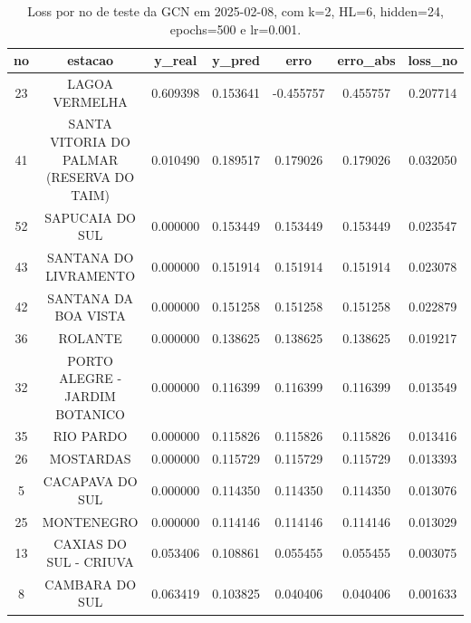 \begin{table}[h]
\centering
\caption{Loss por no de teste da GCN em 2025-02-08, com k=2, HL=6, hidden=24, epochs=500 e lr=0.001.}
\label{tab:gcn_loss_k2_hl6_h24_e500_d20250208}
\begin{tabular}{ccccccc}
\toprule
no & estacao & y\_real & y\_pred & erro & erro\_abs & loss\_no \\
\midrule
23 & LAGOA VERMELHA & 0.609398 & 0.153641 & -0.455757 & 0.455757 & 0.207714 \\
41 & SANTA VITORIA DO PALMAR (RESERVA DO TAIM) & 0.010490 & 0.189517 & 0.179026 & 0.179026 & 0.032050 \\
52 & SAPUCAIA DO SUL & 0.000000 & 0.153449 & 0.153449 & 0.153449 & 0.023547 \\
43 & SANTANA DO LIVRAMENTO & 0.000000 & 0.151914 & 0.151914 & 0.151914 & 0.023078 \\
42 & SANTANA DA BOA VISTA & 0.000000 & 0.151258 & 0.151258 & 0.151258 & 0.022879 \\
36 & ROLANTE & 0.000000 & 0.138625 & 0.138625 & 0.138625 & 0.019217 \\
32 & PORTO ALEGRE - JARDIM BOTANICO & 0.000000 & 0.116399 & 0.116399 & 0.116399 & 0.013549 \\
35 & RIO PARDO & 0.000000 & 0.115826 & 0.115826 & 0.115826 & 0.013416 \\
26 & MOSTARDAS & 0.000000 & 0.115729 & 0.115729 & 0.115729 & 0.013393 \\
5 & CACAPAVA DO SUL & 0.000000 & 0.114350 & 0.114350 & 0.114350 & 0.013076 \\
25 & MONTENEGRO & 0.000000 & 0.114146 & 0.114146 & 0.114146 & 0.013029 \\
13 & CAXIAS DO SUL - CRIUVA & 0.053406 & 0.108861 & 0.055455 & 0.055455 & 0.003075 \\
8 & CAMBARA DO SUL & 0.063419 & 0.103825 & 0.040406 & 0.040406 & 0.001633 \\
\bottomrule
\end{tabular}
\end{table}
